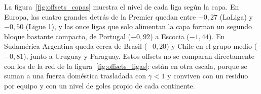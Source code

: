 La figura~\ref{fig:offsets_copas} muestra el nivel de cada liga según la capa. En Europa, las cuatro grandes detrás de la Premier quedan entre $-0{,}27$ (LaLiga) y $-0{,}50$ (Ligue 1), y las once ligas que solo alimentan la capa forman un segundo bloque bastante compacto, de Portugal ($-0{,}92$) a Escocia ($-1{,}44$). En Sudamérica Argentina queda cerca de Brasil ($-0{,}20$) y Chile en el grupo medio ($-0{,}81$), junto a Uruguay y Paraguay. Estos offsets no se comparan directamente con los de la red de la figura~\ref{fig:offsets_ligas}: están en otra escala, porque se suman a una fuerza doméstica trasladada con $\gamma<1$ y conviven con un residuo por equipo y con un nivel de goles propio de cada continente.

